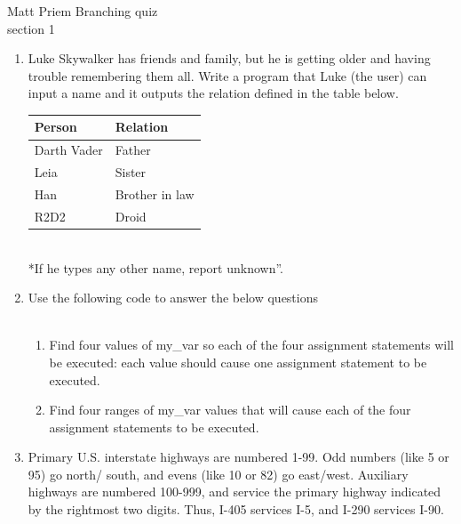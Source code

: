 \documentclass{article}
\newcommand{\csq}[1]{\reflectbox{''}#1''}  %
\begin{document}

Matt Priem \hfill Branching quiz\\
section 1\\
\begin{enumerate}
	\item 
		Luke Skywalker has friends and family, but he is getting older and having trouble 
		remembering them all.  Write a program that Luke (the user) can input a name and it 
		outputs the relation defined in the table below.
		\begin{center}
		\begin{tabular}{|l|l|} \hline
			Person 		& Relation \\ \hline \hline
			Darth Vader	& Father \\ \hline
			Leia		& Sister \\ \hline
			Han			& Brother in law\\ \hline
			R2D2		& Droid \\ \hline
		\end{tabular}\\ \hspace*{1in} *If he types any other name, report \csq{unknown}.
		\end{center}
		


	\item 
		Use the following code to answer the below questions\\
		\mbox{ \hspace*{0.25in}	}
		\begin{enumerate}
			\item Find four values of my\_var so each of the four assignment statements will be executed: 
				each value should cause one assignment statement to be executed.
			\item Find four ranges of my\_var values that will cause each of the four assignment 
				statements to be executed.
		\end{enumerate}


	\item 
		Primary U.S. interstate highways are numbered 1-99.  Odd numbers (like 5 or 95) go north/
		south, and evens (like 10 or 82) go east/west.  Auxiliary highways are numbered 100-999, and 
		service the primary highway indicated by the rightmost two digits.  Thus, I-405 services 
		I-5, and I-290 services I-90.
		

\end{enumerate}
\end{document}
